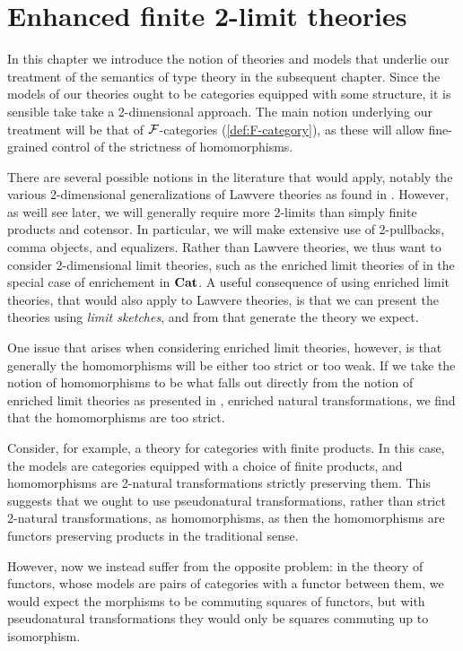 \documentclass[../thesis.tex]{subfiles}
\begin{document}
  \chapter{Enhanced finite 2-limit theories}
  In this chapter we introduce the notion of theories and models that underlie our treatment of
  the semantics of type theory in the subsequent chapter. Since the models of our theories ought
  to be categories equipped with some structure, it is sensible take take a 2-dimensional approach.
  The main notion underlying our treatment will be that of ${\mathcal{F}}$-categories (\cref{def:F-category}),
  as these will allow fine-grained control of the strictness of homomorphisms.

  There are several possible notions in the literature that would apply, notably the various 2-dimensional
  generalizations of Lawvere theories as found in \cite{gray1973, nishizawa2009}. However,
  as weill see later, we will generally require more 2-limits than simply finite products and cotensor.
  In particular, we will make extensive use of 2-pullbacks, comma objects, and equalizers. Rather than
  Lawvere theories, we thus want to consider 2-dimensional limit theories, such as the enriched limit
  theories of \cite{kelly1982a} in the special case of enrichement in ${\mathbf{Cat}}$. A useful consequence of
  using enriched limit theories, that would also apply to Lawvere theories, is that we can present
  the theories using \emph{limit sketches}, and from that generate the theory we expect. 

  \begin{remark}
  One issue that arises when considering enriched limit theories, however, is that generally the
  homomorphisms will be either too strict or too weak. If we take the notion of homomorphisms to
  be what falls out directly from the notion of enriched limit theories as presented in \cite{kelly1982a},
  enriched natural transformations, we find that the homomorphisms are too strict.

  Consider, for example, a theory for categories with finite products. In this case, the models are
  categories equipped with a choice of finite products, and homomorphisms are 2-natural transformations
  strictly preserving them. This suggests that we ought to use pseudonatural transformations, rather than
  strict 2-natural transformations, as homomorphisms, as then the homomorphisms are functors 
  preserving products in the traditional sense.

  However, now we instead suffer from the opposite problem: in the theory of functors, whose models are
  pairs of categories with a functor between them, we would expect the morphisms to be commuting squares
  of functors, but with pseudonatural transformations they would only be squares commuting up to isomorphism.
  \end{remark}
\end{document}
